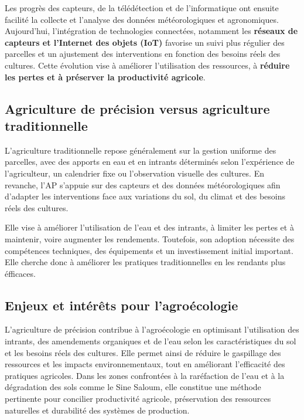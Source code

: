 Les progrès des capteurs, de la télédétection et de l’informatique ont ensuite facilité la collecte et l’analyse des données météorologiques et agronomiques. 
Aujourd’hui, l’intégration de technologies connectées, notamment les \textbf{réseaux de capteurs et l’Internet des objets (IoT)} favorise un suivi plus régulier des parcelles et un ajustement des interventions en fonction des besoins réels des cultures. 
Cette évolution vise à améliorer l’utilisation des ressources, à \textbf{réduire les pertes et à préserver la productivité agricole}.

\subsection{Agriculture de précision versus agriculture traditionnelle}
L'agriculture traditionnelle repose généralement sur la gestion uniforme des parcelles, avec des apports en eau et en intrants 
déterminés selon l'expérience de l'agriculteur, un calendrier fixe ou l'observation visuelle des cultures. 
En revanche, l'AP s'appuie sur des capteurs et des données météorologiques afin d'adapter les interventions face aux variations du sol, du climat et des besoins réels des cultures.

Elle vise à améliorer l'utilisation de l'eau et des intrants, à limiter les pertes et à maintenir, voire augmenter les rendements. 
Toutefois, son adoption nécessite des compétences techniques, des équipements et un investissement initial important. Elle cherche donc à améliorer les pratiques traditionnelles en les rendants plus éfficaces.

\subsection{Enjeux et intérêts pour l'agroécologie}
L'agriculture de précision contribue à l'agroécologie en optimisant l'utilisation des intrants, des amendements organiques et de l'eau selon les caractéristiques du sol et les besoins réels des cultures. 
Elle permet ainsi de réduire le gaspillage des ressources et les impacts environnementaux, tout en améliorant l'efficacité des pratiques agricoles. 
Dans les zones confrontées à la raréfaction de l'eau et à la dégradation des sols comme le Sine Saloum, elle constitue une méthode pertinente pour concilier productivité agricole, préservation des ressources naturelles et durabilité des systèmes de production.
